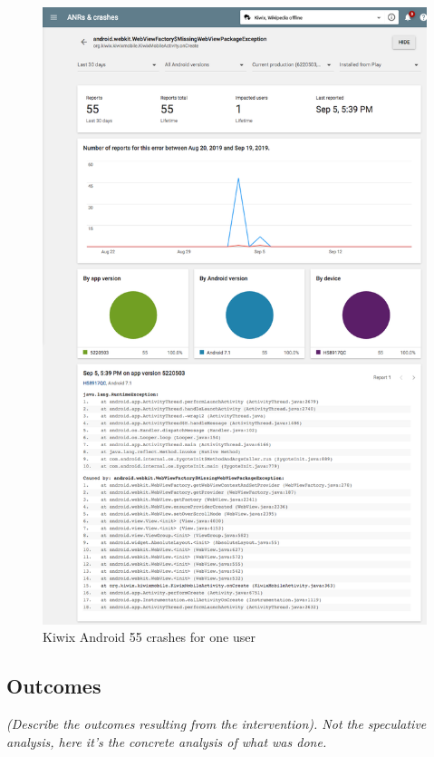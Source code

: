 \begin{figure}
    \centering
    \includegraphics[width=13.5cm]{images/android-vitals-screenshots/55-crashes-WebViewFactory-MissingWebViewPackageException_2019-09-19-kiwix_trimmed.png}
    \caption{Kiwix Android 55 crashes for one user}
    \label{fig:55-crashes-WebViewFactory-MissingWebViewPackageException}
\end{figure}

\FloatBarrier

\subsection{Outcomes}
\textit{(Describe the outcomes resulting from the intervention). Not the speculative analysis, here it’s the concrete analysis of what was done.}

